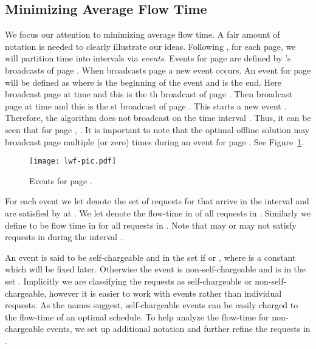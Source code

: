 \documentclass[11pt]{article}
\begin{document}
\begin{titlepage}
\section{Minimizing Average Flow Time}\vspace{-2mm}
\label{sec:broadcast} \vspace{-2mm} We focus our attention to minimizing average flow time. A fair amount of notation
is needed to clearly illustrate our ideas.  Following \cite{EdmondsP04}, for each page, we will partition time into
intervals via \emph{events}.  Events for page  are defined by 's broadcasts of page . When 
broadcasts page  a new event occurs. An event  for page  will be defined as  where  is the beginning of the event and  is the end. Here  broadcast page
 at time  and this is the th broadcast of page . Then  broadcast page  at time 
and this is the st broadcast of page . This starts a new event . Therefore, the algorithm 
does not broadcast  on the time interval . Thus, it can be seen that for page , . It is important to note that the optimal offline solution may broadcast page  multiple (or zero)
times during an event for page .  See Figure~\ref{fig:event}.
\begin{figure}[tbh]
\begin{center}
\texttt{[image: lwf-pic.pdf]}\vspace{-4mm}
\caption{Events for page .} \label{fig:event}
\end{center}
\vspace{-9mm}
\end{figure}


For each event  we let  denote the set of
requests for  that arrive in the interval  and are satisfied by  at . We let
 denote the flow-time in  of all requests in . Similarly we define  to be flow
time in  for all requests in . Note that  may or may not satisfy requests in  during
the interval .

An event  is said to be self-chargeable and in the set  if
 or , where  is a constant which will be fixed later.  Otherwise the event is
non-self-chargeable and is in the set . Implicitly we are
classifying the requests as self-chargeable or non-self-chargeable,
however it is easier to work with events rather than individual
requests. As the names suggest, self-chargeable events can be easily
charged to the flow-time of an optimal schedule. To help analyze the
flow-time for non-chargeable events, we set up additional notation and
further refine the requests in .

\iffalse The intuition behind this distinction is that for self-chargeable events the flow time  accumulates
during  for page  can be ``charged'' to the flow time the optimal solution accumulates for page  during
the event. For non-self-chargeable events, the flow time will not be charged directly to the optimal solution's flow
time. \fi



\end{titlepage}
\end{document}
